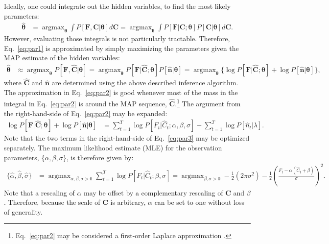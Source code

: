 \documentclass{article}
\providecommand{\ve}[1]{\boldsymbol{#1}}
\DeclareMathOperator*{\argmax}{argmax}
\newcommand{\bth}{\ve{\theta}}
\newcommand{\thetn}{\ve{\theta}}
\newcommand{\thet}{\thetn}
\newcommand{\hbth}{\widehat{\thet}}
\newcommand{\bC}{\ve{C}}
\newcommand{\bF}{\ve{F}}
\newcommand{\hn}{\widehat{n}}
\newcommand{\hC}{\widehat{C}}
\newcommand{\hbn}{\widehat{\ve{n}}}
\newcommand{\hbC}{\widehat{\ve{C}}}
\newcommand{\sig}{\sigma}
\newcommand{\lam}{\lambda}
\newcommand{\halpha}{\widehat{\alpha}}
\newcommand{\hbeta}{\widehat{\beta}}
\newcommand{\hsig}{\widehat{\sigma}}
\begin{document}
Ideally, one could integrate out the hidden variables, to find the most likely parameters:
\begin{align} \label{eq:par1}
\hbth &= \argmax_{\bth} \int P[\bF, \bC | \bth] d\bC  = \argmax_{\bth} \int P[\bF | \bC; \bth] P[\bC | \bth] d\bC.
\end{align}
However, evaluating those integrals is not particularly tractable.
Therefore, Eq.~\eqref{eq:par1} is approximated by simply maximizing the parameters given the MAP estimate of the hidden variables:
\begin{align} \label{eq:par2}
\hbth &\approx \argmax_{\bth} P[\bF, \hbC | \bth] = \argmax_{\bth} P[\bF| \hbC; \bth] P[\hbn | \bth] = \argmax_{\bth} \{ \log P[\bF | \hbC; \bth] + \log P[\hbn | \bth] \}, 
\end{align}
\noindent where $\hbC$ and $\hbn$ are determined using the above described inference algorithm. The approximation in Eq.~\eqref{eq:par2} is good whenever most of the mass in the integral in Eq.~\eqref{eq:par2} is around the MAP sequence, $\hbC$.\footnote{Eq.~\eqref{eq:par2} may be considered a first-order Laplace approximation \cite{KassRaftery95}.}  The argument from the right-hand-side of Eq.~\eqref{eq:par2} may be expanded: 
\begin{align} \label{eq:par3}
\log P[\bF| \hbC; \bth] + \log P[\hbn | \bth] &= \sum_{t=1}^T \log P[F_t | \hC_t; \alpha, \beta,\sig] + \sum_{t=1}^T \log P[\hn_t | \lam].
\end{align}
\noindent Note that the two terms in the right-hand-side of Eq.~\eqref{eq:par3} may be optimized separately.  The maximum likelihood estimate (MLE) for the observation parameters, $\{\alpha,\beta,\sig\}$, is therefore given by:
\begin{align} \label{eq:beta,sig}
	\{\halpha, \hbeta,\hsig\} &=  \argmax_{\alpha, \beta,\sig >0} \sum_{t=1}^T \log P[F_t | \hC_t; \beta,\sig]
	=  \argmax_{\beta,\sig >0} 	-\frac{1}{2} (2\pi \sig^2) - \frac{1}{2} \left(\frac{F_t-\alpha(\hC_t+\beta)}{\sig}\right)^2. %
\end{align}
Note that a rescaling of $\alpha$ may be offset by a complementary rescaling of $\bC$ and $\beta$.  Therefore, because the scale of $\bC$ is arbitrary, $\alpha$ can be set to one without loss of generality.  
\end{document}
